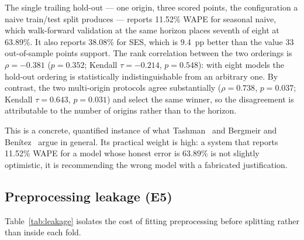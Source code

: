 \documentclass[conference]{IEEEtran}
\begin{document}
The single trailing hold-out --- one origin, three scored points, the
configuration a naive train/test split produces --- reports 11.52\% WAPE for
seasonal naive, which walk-forward validation at the same horizon places
seventh of eight at 63.89\%. It also reports 38.08\% for SES, which is 9.4~pp
better than the value 33 out-of-sample points support. The rank correlation
between the two orderings is $\rho=-0.381$ ($p=0.352$; Kendall
$\tau=-0.214$, $p=0.548$): with eight models the hold-out ordering is
statistically indistinguishable from an arbitrary one. By contrast, the two
multi-origin protocols agree substantially ($\rho=0.738$, $p=0.037$; Kendall
$\tau=0.643$, $p=0.031$) and select the same winner, so the disagreement is
attributable to the number of origins rather than to the horizon.

This is a concrete, quantified instance of what Tashman~\cite{tashman2000outofsample}
and Bergmeir and Ben\'itez~\cite{bergmeir2012cv} argue in general. Its
practical weight is high: a system that reports 11.52\% WAPE for a model whose
honest error is 63.89\% is not slightly optimistic, it is recommending the
wrong model with a fabricated justification.

\subsection{Preprocessing leakage (E5)}

Table~\ref{tab:leakage} isolates the cost of fitting preprocessing before
splitting rather than inside each fold.
\end{document}
